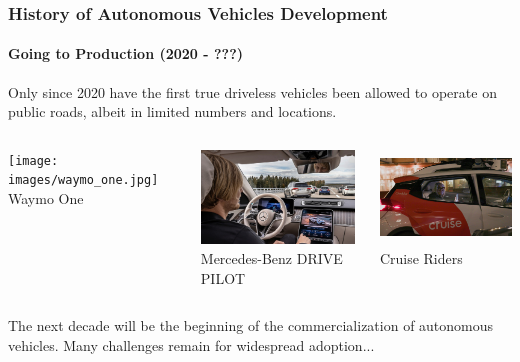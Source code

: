\begin{frame}
\frametitle{History of Autonomous Vehicles Development}
\framesubtitle{Going to Production (2020 - ???)}
Only since 2020 have the first true driveless vehicles been allowed to operate
on public roads, albeit in limited numbers and locations.\\
\begin{columns}[]
    \begin{column}{0.33\textwidth}
        \centering
        \texttt{[image: images/waymo\_one.jpg]} \\
        \footnotesize Waymo One\footnotemark[1]
    \end{column}
    \begin{column}{0.33\textwidth}
        \centering
        \includegraphics[height=2.5cm]{images/mercedes-level-3.jpg} \\
        \footnotesize Mercedes-Benz DRIVE PILOT \cite{MercedesLevel3}
    \end{column}
    \begin{column}{0.33\textwidth}
        \centering
        \includegraphics[height=2.5cm]{images/cruise_riders.jpg} \\
        \footnotesize Cruise Riders \footnotemark[2]
    \end{column}
\end{columns}
\begin{block}{}
The next decade will be the beginning of the commercialization of autonomous
vehicles. Many challenges remain for widespread adoption...
\end{block}
\end{frame}